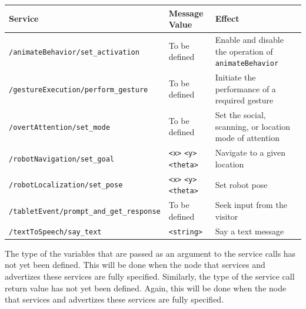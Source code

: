 \documentclass{CSSRforAfrica}
\begin{document}
\begin{center}
\begin{tabularx}{\linewidth}{| l | l | X|}
\hline 
{\small Service }                                                    & {\small Message Value}    &  {\small Effect}       \\
\hline
 {\footnotesize \verb+/animateBehavior/set_activation+} & {\small To be defined} &  {\small Enable and disable the operation of} {\footnotesize \verb+animateBehavior+} \\
\hline
 {\footnotesize \verb+/gestureExecution/perform_gesture+} & {\small To be defined} &  {\small Initiate the performance of a required gesture}\\
\hline
{\footnotesize \verb+/overtAttention/set_mode+} & {\small To be defined} &  {\small Set the social, scanning, or location mode of attention}\\
\hline
{\footnotesize \verb+/robotNavigation/set_goal+}  &  {\footnotesize \verb+<x>+ \verb+<y>+  \verb+<theta>+}  & {\small Navigate to a given location} \\ 
\hline
{\footnotesize \verb+/robotLocalization/set_pose+ }  & {\footnotesize \verb+<x>+ \verb+<y>+  \verb+<theta>+}  & {\small Set robot pose} \\ 
\hline
{\footnotesize \verb+/tabletEvent/prompt_and_get_response+} &{\small To be defined} &  {\small Seek input from the visitor}\\
\hline
{\footnotesize \verb+/textToSpeech/say_text+ }  & {\footnotesize \verb+<string>+} & {\small Say a text message} \\ 

\hline
\end{tabularx}
\end{center}

The type of the variables that are passed as an argument to the service calls  has not yet been defined. This will be done when the node that services and advertizes these services are fully specified.
Similarly, the type of the service call  return value has not yet been defined. Again, this will be done when the node that services and advertizes these services are fully specified.
\end{document}
